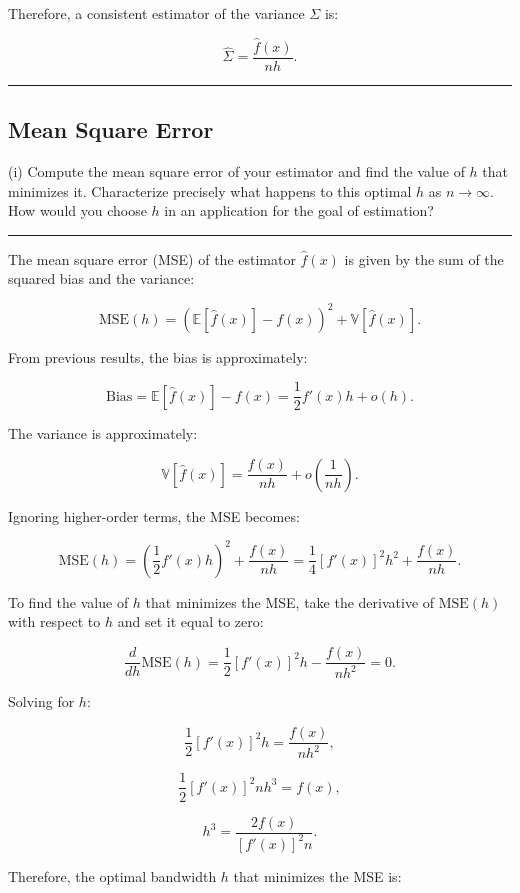 \documentclass{article}
\newenvironment{colorparagraph}[1]{\par\color{#1}}{\par}
\begin{document}
Therefore, a consistent estimator of the variance \( \Sigma \) is:

\[
\hat{\Sigma} = \frac{\hat{f}(x)}{n h}.
\]

\begin{colorparagraph}{questioncolor}
\label{q2i}
\rule{\textwidth}{0.5pt}
\subsection{Mean Square Error}
(i) Compute the mean square error of your estimator and find the value of \( h \) that minimizes it. Characterize precisely what happens to this optimal \( h \) as \( n \to \infty \). How would you choose \( h \) in an application for the goal of estimation?

\rule{\textwidth}{0.5pt}
\end{colorparagraph}

The mean square error (MSE) of the estimator \( \hat{f}(x) \) is given by the sum of the squared bias and the variance:

\[
\text{MSE}(h) = \left( \mathbb{E}[\hat{f}(x)] - f(x) \right)^2 + \mathbb{V}[\hat{f}(x)].
\]

From previous results, the bias is approximately:

\[
\text{Bias} = \mathbb{E}[\hat{f}(x)] - f(x) = \frac{1}{2} f'(x) h + o(h).
\]

The variance is approximately:

\[
\mathbb{V}[\hat{f}(x)] = \frac{f(x)}{n h} + o\left( \frac{1}{n h} \right).
\]

Ignoring higher-order terms, the MSE becomes:

\[
\text{MSE}(h) = \left( \frac{1}{2} f'(x) h \right)^2 + \frac{f(x)}{n h} = \frac{1}{4} [f'(x)]^2 h^2 + \frac{f(x)}{n h}.
\]

To find the value of \( h \) that minimizes the MSE, take the derivative of \( \text{MSE}(h) \) with respect to \( h \) and set it equal to zero:

\[
\frac{d}{d h} \text{MSE}(h) = \frac{1}{2} [f'(x)]^2 h - \frac{f(x)}{n h^2} = 0.
\]

Solving for \( h \):

\[
\frac{1}{2} [f'(x)]^2 h = \frac{f(x)}{n h^2},
\]

\[
\frac{1}{2} [f'(x)]^2 n h^3 = f(x),
\]

\[
h^3 = \frac{2 f(x)}{[f'(x)]^2 n}.
\]

Therefore, the optimal bandwidth \( h \) that minimizes the MSE is:
\end{document}
